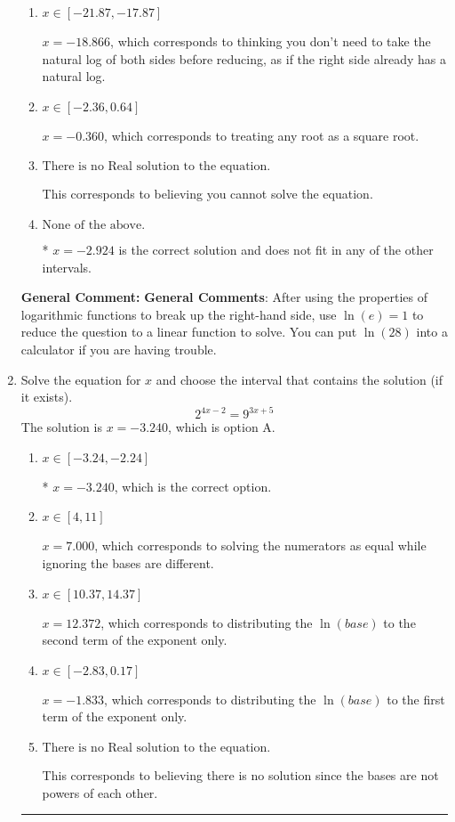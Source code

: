 \documentclass{extbook}[14pt]
\newcommand{\litem}[1]{\item #1

\rule{\textwidth}{0.4pt}}
\begin{document}
\begin{enumerate}
{\begin{enumerate}[label=\Alph*.]
$x = 2.924$, which is the negative of the correct solution.
\item \( x \in [-21.87, -17.87] \)

$x = -18.866$, which corresponds to thinking you don't need to take the natural log of both sides before reducing, as if the right side already has a natural log.
\item \( x \in [-2.36, 0.64] \)

$x = -0.360$, which corresponds to treating any root as a square root.
\item \( \text{There is no Real solution to the equation.} \)

This corresponds to believing you cannot solve the equation.
\item \( \text{None of the above.} \)

* $x = -2.924$ is the correct solution and does not fit in any of the other intervals.
\end{enumerate}

\textbf{General Comment:} \textbf{General Comments}: After using the properties of logarithmic functions to break up the right-hand side, use $\ln(e) = 1$ to reduce the question to a linear function to solve. You can put $\ln(28)$ into a calculator if you are having trouble.
}
\litem{
Solve the equation for $x$ and choose the interval that contains the solution (if it exists).
\[ 2^{4x-2} = 9^{3x+5} \]The solution is \( x = -3.240 \), which is option A.\begin{enumerate}[label=\Alph*.]
\item \( x \in [-3.24, -2.24] \)

* $x = -3.240$, which is the correct option.
\item \( x \in [4, 11] \)

$x = 7.000$, which corresponds to solving the numerators as equal while ignoring the bases are different.
\item \( x \in [10.37, 14.37] \)

$x = 12.372$, which corresponds to distributing the $\ln(base)$ to the second term of the exponent only.
\item \( x \in [-2.83, 0.17] \)

$x = -1.833$, which corresponds to distributing the $\ln(base)$ to the first term of the exponent only.
\item \( \text{There is no Real solution to the equation.} \)

This corresponds to believing there is no solution since the bases are not powers of each other.
\end{enumerate}

}
\end{enumerate}
\end{document}
